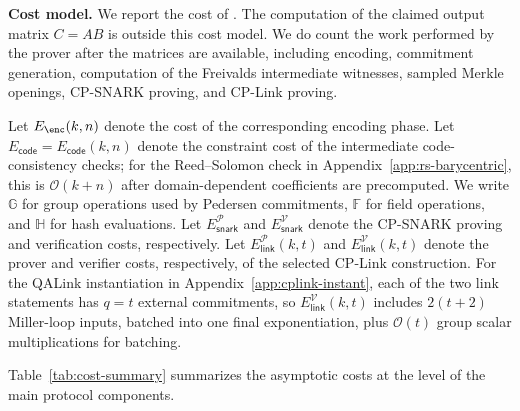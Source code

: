 \noindent\textbf{Cost model.}
We report the cost of \protocol.  The computation of the claimed output matrix \(C=AB\) is outside this cost model.
We do count the work performed by the \protocol prover after the matrices are available, including encoding, commitment generation, computation of the Freivalds intermediate witnesses, sampled Merkle openings, CP-SNARK proving, and CP-Link proving.

Let \(E_{\enc}(k,n)\) denote the cost of the corresponding encoding phase.
Let \(E_{\mathsf{code}}=E_{\mathsf{code}}(k,n)\) denote the constraint cost of the intermediate
code-consistency checks; for the Reed--Solomon check in
Appendix~\ref{app:rs-barycentric}, this is \(\mathcal{O}(k+n)\) after
domain-dependent coefficients are precomputed.
We write \(\mathbb{G}\) for group operations used by Pedersen commitments,
\(\mathbb{F}\) for field operations, and \(\mathbb{H}\) for hash evaluations.
Let \(E_{\mathsf{snark}}^{\mathcal{P}}\) and \(E_{\mathsf{snark}}^{\mathcal{V}}\) denote the CP-SNARK proving and
verification costs, respectively. Let \(E_{\mathsf{link}}^\mathcal{P}(k,t)\) and \(E_{\mathsf{link}}^\mathcal{V}(k,t)\) denote the prover and verifier costs, respectively, of the selected CP-Link construction.
For the QALink instantiation in Appendix~\ref{app:cplink-instant}, each of the
two link statements has \(q=t\) external commitments, so
\(E_{\mathsf{link}}^\mathcal{V}(k,t)\) includes \(2(t+2)\) Miller-loop inputs,
batched into one final exponentiation, plus \(\mathcal{O}(t)\) group scalar
multiplications for batching.

Table~\ref{tab:cost-summary} summarizes the asymptotic costs at the level of the main protocol components. \\

